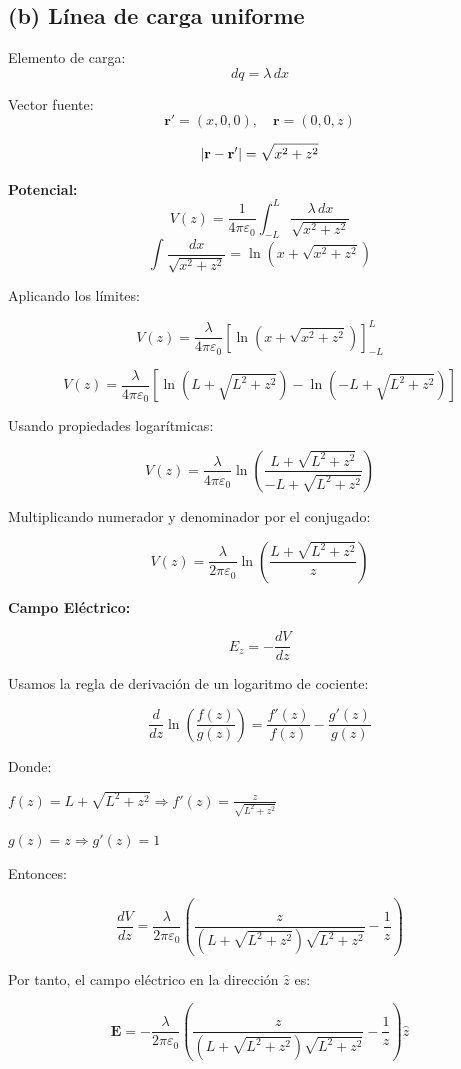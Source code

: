 \documentclass[12pt]{article}
\begin{document}
\subsection*{(b) Línea de carga uniforme}

Elemento de carga:
\[
dq = \lambda \, dx
\]

Vector fuente:
\[
\mathbf{r}' = (x, 0, 0), \quad \mathbf{r} = (0, 0, z)
\]

\[
\abs{\mathbf{r} - \mathbf{r}'} = \sqrt{x^2 + z^2}
\]

\textbf{Potencial:}
\[
V(z) = \frac{1}{4\pi\varepsilon_0} \int_{-L}^{L} \frac{\lambda \, dx}{\sqrt{x^2 + z^2}} 
\]
\[
\int \frac{dx}{\sqrt{x^2 + z^2}} = \ln\left(x + \sqrt{x^2 + z^2} \right)
\]

Aplicando los límites:

\[
V(z) = \frac{\lambda}{4\pi \varepsilon_0} \left[ \ln\left(x + \sqrt{x^2 + z^2}\right) \right]_{-L}^{L}
\]

\[
V(z) = \frac{\lambda}{4\pi \varepsilon_0} \left[ \ln\left(L + \sqrt{L^2 + z^2} \right) - \ln\left(-L + \sqrt{L^2 + z^2} \right) \right]
\]

Usando propiedades logarítmicas:

\[
V(z) = \frac{\lambda}{4\pi \varepsilon_0} \ln\left( \frac{L + \sqrt{L^2 + z^2}}{-L + \sqrt{L^2 + z^2}} \right)
\]

Multiplicando numerador y denominador por el conjugado:

\[
V(z) = \frac{\lambda}{2\pi \varepsilon_0} \ln\left( \frac{L + \sqrt{L^2 + z^2}}{z} \right)
\]

\textbf{Campo Eléctrico:}

\[
E_z = -\frac{dV}{dz}
\]


Usamos la regla de derivación de un logaritmo de cociente:

\[
\frac{d}{dz} \ln\left( \frac{f(z)}{g(z)} \right) = \frac{f'(z)}{f(z)} - \frac{g'(z)}{g(z)}
\]

Donde:

\(f(z) = L + \sqrt{L^2 + z^2} \Rightarrow f'(z) = \frac{z}{\sqrt{L^2 + z^2}}\)

\(g(z) = z \Rightarrow g'(z) = 1\)

Entonces:

\[
\frac{dV}{dz} = \frac{\lambda}{2\pi \varepsilon_0} \left( \frac{z}{(L + \sqrt{L^2 + z^2}) \sqrt{L^2 + z^2}} - \frac{1}{z} \right)
\]

Por tanto, el campo eléctrico en la dirección \(\hat{z}\) es:

\[
\mathbf{E} = - \frac{\lambda}{2\pi \varepsilon_0} \left( \frac{z}{(L + \sqrt{L^2 + z^2}) \sqrt{L^2 + z^2}} - \frac{1}{z} \right) \hat{z}
\]
\end{document}
